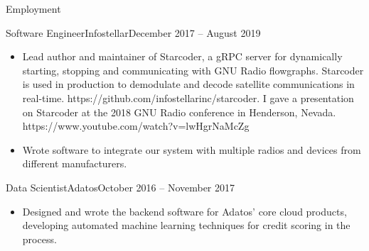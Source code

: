 \documentclass[]{mcdowellcv}
\begin{document}
	\makeheader
	
	\begin{cvsection}{Employment}
		\begin{cvsubsection}{Software Engineer}{Infostellar}{December 2017 -- August 2019}
			\begin{itemize}
				\item Lead author and maintainer of Starcoder, a gRPC server for dynamically starting, stopping and communicating with GNU Radio flowgraphs. Starcoder is used in production to demodulate and decode satellite communications in real-time. https://github.com/infostellarinc/starcoder. I gave a presentation on Starcoder at the 2018 GNU Radio conference in Henderson, Nevada. https://www.youtube.com/watch?v=lwHgrNaMcZg
				\item Wrote software to integrate our system with multiple radios and devices from different manufacturers.
			\end{itemize}
		\end{cvsubsection}
		
		\begin{cvsubsection}{Data Scientist}{Adatos}{October 2016 -- November 2017}	
			\begin{itemize}
				\item Designed and wrote the backend software for Adatos' core cloud products, developing automated machine learning techniques for credit scoring in the process.
			\end{itemize}
		\end{cvsubsection}
	\end{cvsection}
	
\end{document}

